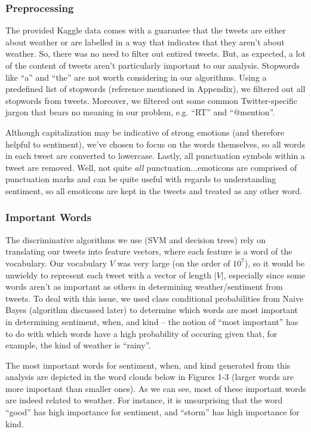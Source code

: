 \subsubsection{Preprocessing}
	The provided Kaggle data comes with a guarantee that the tweets are either about weather or are labelled in a way that indicates that they aren't about weather. So, there was no need to filter out entired tweets. But, as expected, a lot of the content of tweets aren't particularly important to our analysis. Stopwords like ``a'' and ``the'' are not worth considering in our algorithms. Using a predefined list of stopwords (reference mentioned in Appendix), we filtered out all stopwords from tweets. Moreover, we filtered out some common Twitter-specific jargon that bears no meaning in our problem, e.g. ``RT'' and ``@mention''.
	
	 Although capitalization may be indicative of strong emotions (and therefore helpful to sentiment), we've chosen to focus on the words themselves, so all words in each tweet are converted to lowercase. Lastly, all  punctuation symbols within a tweet are removed. Well, not quite \emph{all} punctuation...emoticons are comprised of punctuation marks and can be quite useful with regards to understanding sentiment, so all emoticons are kept in the tweets and treated as any other word.



\subsubsection{Important Words}
	The discriminative algorithms we use (SVM and decision trees) rely on translating our tweets into feature vectors, where each feature is a word of the vocabulary. Our vocabulary $V$ was very large (on the order of $10^7$), so it would be unwieldy to represent each tweet with a vector of length $|V|$, especially since some words aren't as important as others in determining weather/sentiment from tweets. To deal with this issue, we used class conditional probabilities from Naive Bayes (algorithm discussed later) to determine which words are most important in determining sentiment, when, and kind -- the notion of ``most important'' has to do with which words have a high probability of occuring given that, for example, the kind of weather is ``rainy''.

	The most important words for sentiment, when, and kind generated from this analysis are depicted in the word clouds below in Figures 1-3 (larger words are more important than smaller ones). As we can see, most of these important words are indeed related to weather. For instance, it is unsurprising that the word ``good'' has high importance for sentiment, and ``storm'' has high importance for kind.

